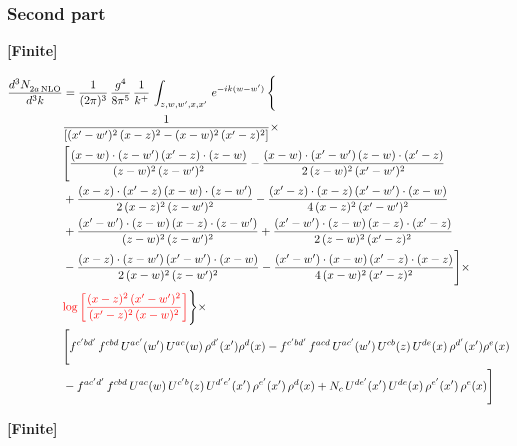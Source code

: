 \documentclass[9pt]{article}
\numberwithin{equation}{section}
\begin{document}
\subsubsection{Second part}
\par\smallskip\noindent\textbf{[Finite]}\par\nobreak
\begin{align}
    \frac{d^{3}N_{2a\,\rm NLO}^{\rm}}{d^{3}k}  & =  \frac{1}{(2\pi)^{3}}\, \frac{g^{4}}{8\pi^{5}}\,\frac{1}{k^{+}}\,\int_{z,w,w^{\prime},x,x'}\, e^{-ik(w-w^{\prime})}\, \Bigg\{\notag \\
& \frac{1}{\left[(x'-w')^{2}\, (x-z)^{2}-(x-w)^{2}\, (x'-z)^{2}\right]}\times\,\notag \\ & \Bigg[\frac{(x-w)\cdot (z-w')\, (x'-z)\cdot (z-w)}{(z-w)^{2}\,(z-w')^{2}}-\frac{(x-w)\cdot (x'-w')\, (z-w)\cdot (x'-z)}{2\, (z-w)^{2}\, (x'-w')^{2}}\notag \\ & + \frac{(x-z)\cdot (x'-z)\, (x-w)\cdot (z-w')}{2\, (x-z)^{2}\, (z-w')^{2}}-\frac{(x'-z)\cdot (x-z)\, (x'-w')\cdot (x-w)}{4\, (x-z)^{2}\, (x'-w')^{2}}\notag \\ & + \frac{(x'-w')\cdot (z-w)\, (x-z)\cdot (z-w')}{(z-w)^{2}\,(z-w')^{2}}+\frac{(x'-w')\cdot (z-w)\, (x-z)\cdot (x'-z)}{2\, (z-w)^{2}\, (x'-z)^{2}}\notag \\ & - \frac{(x-z)\cdot (z-w')\, (x'-w')\cdot (x-w)}{2\, (x-w)^{2}\, (z-w')^{2}} -\frac{(x'-w')\cdot (x-w)\, (x'-z)\cdot (x-z)}{4\, (x-w)^{2}\, (x'-z)^{2}}\Bigg]\times\notag \\ &  {\color{red}\log{\left[\frac{(x-z)^{2}\,(x'-w')^{2}}{(x'-z)^{2}\,(x-w)^{2}}\right]}}\Bigg\} \times\, \notag \\ & \Bigg[f^{c'bd'}\,f^{cbd}\, U^{ac'}(w')\,U^{ac}(w)\,\rho^{d'}(x')\rho^{d}(x)- f^{c'bd'}\,f^{acd}\,U^{ac'}(w')\,U^{cb}(z)\,U^{de}(x)\,\rho^{d'}(x')\rho^{e}(x) \notag \\ & -f^{ac'd'}\,f^{cbd}\,U^{ac}(w)\,U^{c'b}(z)\,U^{d'e'}(x')\,\rho^{e'}(x')\,\rho^{d}(x) +N_{c}\,U^{de'}(x')\,U^{de}(x)\,\rho^{e'}(x')\,\rho^{e}(x)\Bigg]
\end{align}
\par\smallskip\noindent\textbf{[Finite]}\par\nobreak
\end{document}
